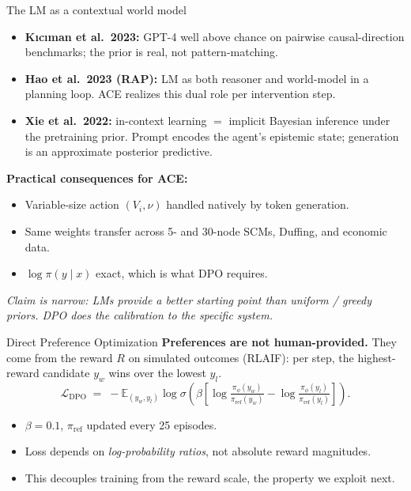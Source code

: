 \documentclass[aspectratio=169,10pt]{beamer}
\begin{document}
\begin{frame}{The LM as a contextual world model}
\begin{itemize}
\item \textbf{K\i c\i man et al.\ 2023:} GPT-4 well above chance on pairwise causal-direction
      benchmarks; the prior is real, not pattern-matching.
\item \textbf{Hao et al.\ 2023 (RAP):} LM as both reasoner and world-model in a
      planning loop. ACE realizes this dual role per intervention step.
\item \textbf{Xie et al.\ 2022:} in-context learning $=$ implicit Bayesian inference
      under the pretraining prior. Prompt encodes the agent's epistemic state;
      generation is an approximate posterior predictive.
\end{itemize}
\smallskip
\textbf{Practical consequences for ACE:}
\begin{itemize}
\item Variable-size action $(V_i,\nu)$ handled natively by token generation.
\item Same weights transfer across 5- and 30-node SCMs, Duffing, and economic data.
\item $\log\pi(y\mid x)$ exact, which is what DPO requires.
\end{itemize}
\smallskip
\footnotesize\textit{Claim is narrow: LMs provide a better starting point than uniform / greedy
priors. DPO does the calibration to the specific system.}
\end{frame}

\begin{frame}{Direct Preference Optimization}
\textbf{Preferences are not human-provided.} They come from the reward $R$ on
simulated outcomes (RLAIF): per step, the highest-reward candidate $y_w$ wins
over the lowest $y_l$.
\[
\mathcal{L}_\text{DPO} \;=\; -\mathbb{E}_{(y_w,y_l)}
   \log\sigma\!\left(\beta
   \left[\log\tfrac{\pi_\phi(y_w)}{\pi_\text{ref}(y_w)}
        - \log\tfrac{\pi_\phi(y_l)}{\pi_\text{ref}(y_l)}\right]\right).
\]
\begin{itemize}
\item $\beta=0.1$, $\pi_\text{ref}$ updated every 25 episodes.
\item Loss depends on \emph{log-probability ratios}, not absolute reward magnitudes.
\item This decouples training from the reward scale, the property we exploit next.
\end{itemize}
\end{frame}
\end{document}
